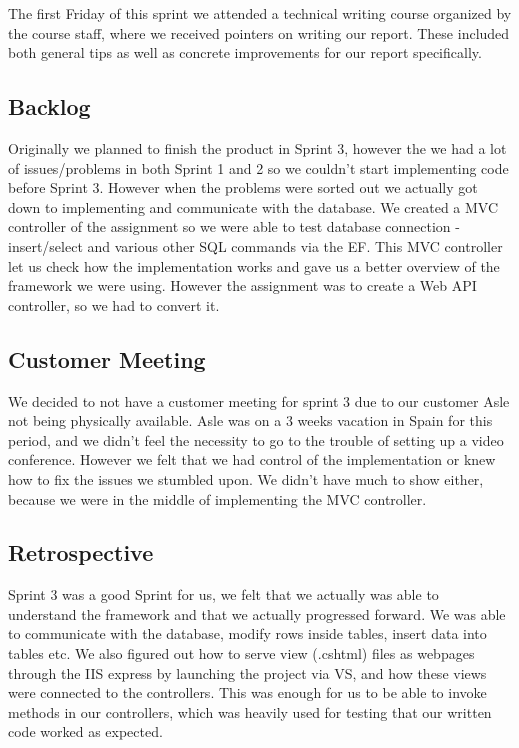 The first Friday of this sprint we attended a technical writing course organized by the course staff, where we received pointers on writing our report. These included both general tips as well as concrete improvements for our report specifically.

\subsection{Backlog}
Originally we planned to finish the product in Sprint 3, however the we had a lot of issues/problems in both Sprint 1 and 2 so we couldn't start implementing code before Sprint 3. However when the problems were sorted out we actually got down to implementing and communicate with the database. We created a MVC controller of the assignment so we were able to test database connection - insert/select and various other SQL commands via the EF. This MVC controller let us check how the implementation works and gave us a better overview of the framework we were using. However the assignment was to create a Web API controller, so we had to convert it.


\subsection{Customer Meeting}
We decided to not have a customer meeting for sprint 3 due to our customer Asle not being physically available. Asle was on a 3 weeks vacation in Spain for this period, and we didn't feel the necessity to go to the trouble of setting up a video conference.
However we felt that we had control of the implementation or knew how to fix the issues we stumbled upon. We didn't have much to show either, because we were in the middle of implementing the MVC controller.

\subsection{Retrospective}
Sprint 3 was a good Sprint for us, we felt that we actually was able to understand the framework and that we actually progressed forward. We was able to communicate with the database, modify rows inside tables, insert data into tables etc.
We also figured out how to serve view (.cshtml) files as webpages through the IIS express by launching the project via VS, and how these views were connected to the controllers. This was enough for us to be able to invoke methods in our controllers, which was heavily used for testing that our written code worked as expected.